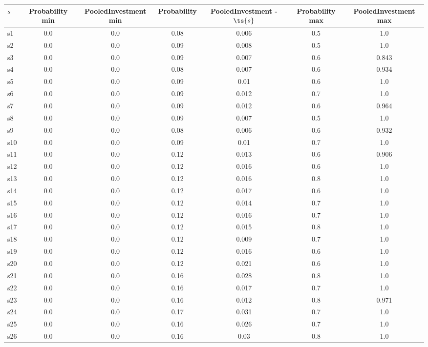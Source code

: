 \documentclass{article}
\begin{document}
\noindent\begin{tabular}{|l|c|c|c|c|c|c|}
\hline
$s$& Probability min & PooledInvestment min & Probability & PooledInvestment - $\ts{s}$ & Probability max & PooledInvestment max\\
\hline
s1 &0.0 & 0.0 & 0.08 & 0.006 & 0.5 & 1.0\\
\hline
s2 &0.0 & 0.0 & 0.09 & 0.008 & 0.5 & 1.0\\
\hline
s3 &0.0 & 0.0 & 0.09 & 0.007 & 0.6 & 0.843\\
\hline
s4 &0.0 & 0.0 & 0.08 & 0.007 & 0.6 & 0.934\\
\hline
s5 &0.0 & 0.0 & 0.09 & 0.01 & 0.6 & 1.0\\
\hline
s6 &0.0 & 0.0 & 0.09 & 0.012 & 0.7 & 1.0\\
\hline
s7 &0.0 & 0.0 & 0.09 & 0.012 & 0.6 & 0.964\\
\hline
s8 &0.0 & 0.0 & 0.09 & 0.007 & 0.5 & 1.0\\
\hline
s9 &0.0 & 0.0 & 0.08 & 0.006 & 0.6 & 0.932\\
\hline
s10 &0.0 & 0.0 & 0.09 & 0.01 & 0.7 & 1.0\\
\hline
s11 &0.0 & 0.0 & 0.12 & 0.013 & 0.6 & 0.906\\
\hline
s12 &0.0 & 0.0 & 0.12 & 0.016 & 0.6 & 1.0\\
\hline
s13 &0.0 & 0.0 & 0.12 & 0.016 & 0.8 & 1.0\\
\hline
s14 &0.0 & 0.0 & 0.12 & 0.017 & 0.6 & 1.0\\
\hline
s15 &0.0 & 0.0 & 0.12 & 0.014 & 0.7 & 1.0\\
\hline
s16 &0.0 & 0.0 & 0.12 & 0.016 & 0.7 & 1.0\\
\hline
s17 &0.0 & 0.0 & 0.12 & 0.015 & 0.8 & 1.0\\
\hline
s18 &0.0 & 0.0 & 0.12 & 0.009 & 0.7 & 1.0\\
\hline
s19 &0.0 & 0.0 & 0.12 & 0.016 & 0.6 & 1.0\\
\hline
s20 &0.0 & 0.0 & 0.12 & 0.021 & 0.6 & 1.0\\
\hline
s21 &0.0 & 0.0 & 0.16 & 0.028 & 0.8 & 1.0\\
\hline
s22 &0.0 & 0.0 & 0.16 & 0.017 & 0.7 & 1.0\\
\hline
s23 &0.0 & 0.0 & 0.16 & 0.012 & 0.8 & 0.971\\
\hline
s24 &0.0 & 0.0 & 0.17 & 0.031 & 0.7 & 1.0\\
\hline
s25 &0.0 & 0.0 & 0.16 & 0.026 & 0.7 & 1.0\\
\hline
s26 &0.0 & 0.0 & 0.16 & 0.03 & 0.8 & 1.0\\

\end{tabular}
\end{document}
